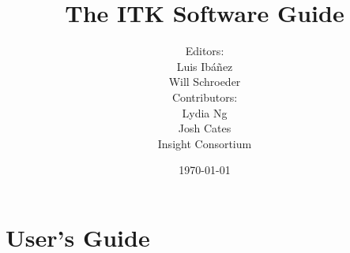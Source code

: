 \documentclass[twoside,titlepage]{InsightBook}
\title{The ITK Software Guide}
\author{Editors:\\Luis Ib\'{a}\~{n}ez\\Will Schroeder\\
        Contributors:\\Lydia Ng\\Josh Cates\\Insight Consortium}
\date{\today}
\newif\ifitkFullVersion
\begin{document}
\maketitle

\frontmatter


\ifitkFullVersion 

\fi

\tableofcontents


\mainmatter

\ifitkFullVersion
\part{Introduction}




\fi


\part{User's Guide}

\ifitkFullVersion

\fi

\ifitkFullVersion

\fi

\ifitkFullVersion

\fi

\ifitkFullVersion

\fi

\ifitkFullVersion

\fi



\ifitkFullVersion
\part{Developer's Guide}



\fi

\backmatter


%
%

\listoffigures
\listoftables


%
%





%
%

\end{document}
